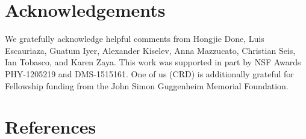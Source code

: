 \documentclass[12pt]{iopart}
\begin{document}
\section*{Acknowledgements}
We gratefully acknowledge helpful comments from Hongjie Done, Luis Escauriaza, Guatum Iyer, Alexander Kiselev, Anna Mazzucato, Christian Seis, Ian Tobasco, and Karen Zaya. This work was supported in part by NSF Awards PHY-1205219 and DMS-1515161. One of us (CRD) is additionally grateful for Fellowship funding from the John Simon Guggenheim Memorial Foundation. 

 

\section*{References}


\end{document}
